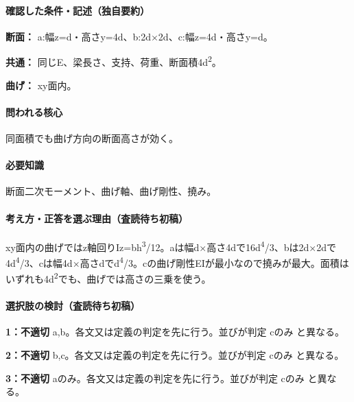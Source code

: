 \paragraph{確認した条件・記述（独自要約）}\mbox{}\par

\noindent\textbf{断面：} a:幅z=\allowbreak{}d・高さy=\allowbreak{}4d、b:2d×2d、c:幅z=\allowbreak{}4d・高さy=\allowbreak{}d。\par

\noindent\textbf{共通：} 同じE、梁長さ、支持、荷重、断面積4d\textsuperscript{2}。\par

\noindent\textbf{曲げ：} xy面内。\par

\paragraph{問われる核心} 同面積でも曲げ方向の断面高さが効く。

\paragraph{必要知識} 断面二次モーメント、曲げ軸、曲げ剛性、撓み。

\paragraph{考え方・正答を選ぶ理由（査読待ち初稿）} xy面内の曲げではz軸回りIz=\allowbreak{}bh\textsuperscript{3}/12。aは幅d×高さ4dで16d\textsuperscript{4}/3、bは2d×2dで4d\textsuperscript{4}/3、cは幅4d×高さdでd\textsuperscript{4}/3。cの曲げ剛性EIが最小なので撓みが最大。面積はいずれも4d\textsuperscript{2}でも、曲げでは高さの三乗を使う。

\paragraph{選択肢の検討（査読待ち初稿）}\mbox{}\par

\noindent\textbf{1：不適切} a,b。各文又は定義の判定を先に行う。並びが判定 cのみ と異なる。\par

\noindent\textbf{2：不適切} b,c。各文又は定義の判定を先に行う。並びが判定 cのみ と異なる。\par

\noindent\textbf{3：不適切} aのみ。各文又は定義の判定を先に行う。並びが判定 cのみ と異なる。\par

